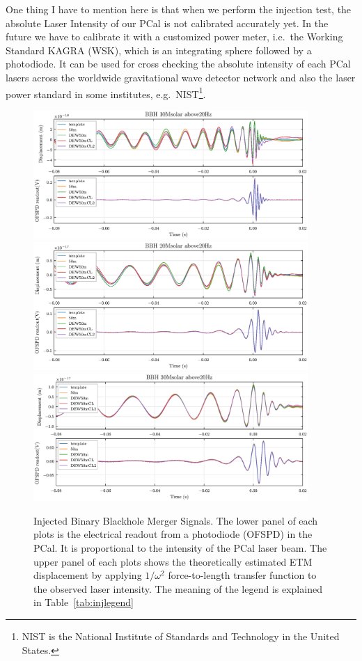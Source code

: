 One thing I have to mention here is that when we perform the injection test, the absolute Laser Intensity of our PCal is not calibrated accurately yet. In the future we have to calibrate it with a customized power meter, i.e.~the Working Standard KAGRA (WSK), which is an integrating sphere followed by a photodiode. It can be used for cross checking the absolute intensity of each PCal lasers across the worldwide gravitational wave detector network and also the laser power standard in some institutes, e.g.~NIST\footnote{NIST is the National Institute of Standards and Technology in the United States.}.
 


  

\begin{figure}[hbt!]
\centering
\includegraphics[width=0.93\textwidth]{figure/inj/10.eps}
\includegraphics[width=0.93\textwidth]{figure/inj/20.eps}
\includegraphics[width=0.93\textwidth]{figure/inj/30.eps}
\caption[Injected Binary Blackhole Merger Signals]{Injected Binary Blackhole Merger Signals. The lower panel of each plots is the electrical readout from a photodiode (OFSPD) in the PCal. It is proportional to the intensity of the PCal laser beam. The upper panel of each plots shows the theoretically estimated ETM displacement by applying $1/\omega^2$ force-to-length transfer function to the observed laser intensity. The meaning of the legend is explained in Table~\ref{tab:injlegend}}
\label{fig:bbhinj}
\end{figure}


